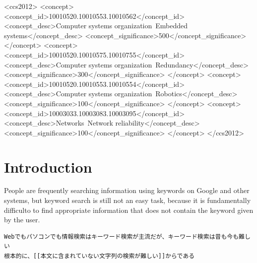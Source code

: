\documentclass[manuscript,screen,review]{acmart}
\begin{document}
\begin{CCSXML}
<ccs2012>
 <concept>
  <concept_id>10010520.10010553.10010562</concept_id>
  <concept_desc>Computer systems organization~Embedded systems</concept_desc>
  <concept_significance>500</concept_significance>
 </concept>
 <concept>
  <concept_id>10010520.10010575.10010755</concept_id>
  <concept_desc>Computer systems organization~Redundancy</concept_desc>
  <concept_significance>300</concept_significance>
 </concept>
 <concept>
  <concept_id>10010520.10010553.10010554</concept_id>
  <concept_desc>Computer systems organization~Robotics</concept_desc>
  <concept_significance>100</concept_significance>
 </concept>
 <concept>
  <concept_id>10003033.10003083.10003095</concept_id>
  <concept_desc>Networks~Network reliability</concept_desc>
  <concept_significance>100</concept_significance>
 </concept>
</ccs2012>
\end{CCSXML}




\maketitle

\section{Introduction}

People are frequently searching information using keywords on Google
and other systems, but keyword search is still not an easy task,
because it is fundamentally difficulto to find appropriate information
that does not contain the keyword given by the user.

\begin{verbatim}
Webでもパソコンでも情報検索はキーワード検索が主流だが、キーワード検索は昔も今も難しい
根本的に、[[本文に含まれていない文字列の検索が難しい]]からである
\end{verbatim}
\end{document}
